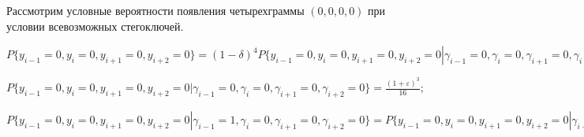 \documentclass[a4paper,12pt]{article}
\theoremstyle{plain}
\begin{document}
Рассмотрим  условные вероятности появления четырехграммы $(0,0,0,0)$ при условии всевозможных стегоключей.

$P\{y_{i-1} = 0, y_i = 0, y_{i+1} = 0, y_{i+2} = 0\} =  (1-\delta)^4P\{y_{i-1} = 0, y_i = 0, y_{i+1} = 0, y_{i+2} = 0 |\gamma_{i-1}=0,\gamma_i=0,\gamma_{i+1}=0, \gamma_{i+2} = 0\} + 
\delta(1-\delta)^3\biggr(P\{y_{i-1} = 0, y_i = 0, y_{i+1} = 0, y_{i+2} = 0 |\gamma_{i-1}=0,\gamma_i=0,\gamma_{i+1}=0, \gamma_{i+2} = 1\} +
P\{y_{i-1} = 0, y_i = 0, y_{i+1} = 0, y_{i+2} = 0 |\gamma_{i-1}=0,\gamma_i=0,\gamma_{i+1}=1, \gamma_{i+2} = 0\} +
P\{y_{i-1} = 0, y_i = 0, y_{i+1} = 0, y_{i+2} = 0 |\gamma_{i-1}=0,\gamma_i=1,\gamma_{i+1}=0, \gamma_{i+2} = 0\} +
P\{y_{i-1} = 0, y_i = 0, y_{i+1} = 0, y_{i+2} = 0 |\gamma_{i-1}=1,\gamma_i=0,\gamma_{i+1}=0, \gamma_{i+2} = 0\}\biggr) +
\delta^2(1-\delta)^2 \biggr(P\{y_{i-1} = 0, y_i = 0, y_{i+1} = 0, y_{i+2} = 0 |\gamma_{i-1}=0,\gamma_i=0,\gamma_{i+1}=1, \gamma_{i+2} = 1\} +
P\{y_{i-1} = 0, y_i = 0, y_{i+1} = 0, y_{i+2} = 0 |\gamma_{i-1}=0,\gamma_i=1,\gamma_{i+1}=1, \gamma_{i+2} = 0\} +
P\{y_{i-1} = 0, y_i = 0, y_{i+1} = 0, y_{i+2} = 0 |\gamma_{i-1}=1,\gamma_i=1,\gamma_{i+1}=0, \gamma_{i+2} = 0\} +
P\{y_{i-1} = 0, y_i = 0, y_{i+1} = 0, y_{i+2} = 0 |\gamma_{i-1}=1,\gamma_i=0,\gamma_{i+1}=1, \gamma_{i+2} = 0\}+
P\{y_{i-1} = 0, y_i = 0, y_{i+1} = 0, y_{i+2} = 0 |\gamma_{i-1}=0,\gamma_i=1,\gamma_{i+1}=0, \gamma_{i+2} = 1\}+
P\{y_{i-1} = 0, y_i = 0, y_{i+1} = 0, y_{i+2} = 0 |\gamma_{i-1}=1,\gamma_i=0,\gamma_{i+1}=0, \gamma_{i+2} = 1\}\biggr)
+\delta^3(1-\delta) \biggr(P\{y_{i-1} = 0, y_i = 0, y_{i+1} = 0, y_{i+2} = 0 |\gamma_{i-1}=0,\gamma_i=1,\gamma_{i+1}=1, \gamma_{i+2} = 1\} +
P\{y_{i-1} = 0, y_i = 0, y_{i+1} = 0, y_{i+2} = 0 |\gamma_{i-1}=1,\gamma_i=0,\gamma_{i+1}=1, \gamma_{i+2} = 1\} +
P\{y_{i-1} = 0, y_i = 0, y_{i+1} = 0, y_{i+2} = 0 |\gamma_{i-1}=1,\gamma_i=1,\gamma_{i+1}=0, \gamma_{i+2} = 1\} +
P\{y_{i-1} = 0, y_i = 0, y_{i+1} = 0, y_{i+2} = 0 |\gamma_{i-1}=1,\gamma_i=1,\gamma_{i+1}=1, \gamma_{i+2} = 0\}\biggr)
+ \delta^4 (	P\{y_{i-1} = 0, y_i = 0, y_{i+1} = 0, y_{i+2} = 0 |\gamma_{i-1}=1,\gamma_i=1,\gamma_{i+1}=1, \gamma_{i+2} = 1\}).$\newline

$P\{y_{i-1} = 0, y_i = 0, y_{i+1} = 0, y_{i+2} = 0 |\gamma_{i-1}=0,\gamma_i=0,\gamma_{i+1}=0, \gamma_{i+2} = 0\}=\frac{(1+\varepsilon)^3}{16};$\newline

$P\{y_{i-1} = 0, y_i = 0, y_{i+1} = 0, y_{i+2} = 0 |\gamma_{i-1}=1,\gamma_i=0,\gamma_{i+1}=0, \gamma_{i+2} = 0\}=P\{y_{i-1} = 0, y_i = 0, y_{i+1} = 0, y_{i+2} = 0 |\gamma_{i-1}=0,\gamma_i=0,\gamma_{i+1}=0, \gamma_{i+2} = 1\}=\frac{(1+\varepsilon)^2}{16};$\newline
\end{document}
